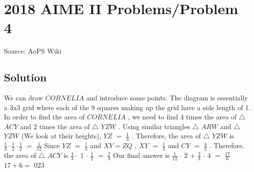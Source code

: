 \documentclass[12pt]{article}
\begin{document}
\section*{{2018 AIME II Problems/Problem 4}}
Source: AoPS Wiki

\subsection*{Solution}
We can draw $CORNELIA$ and introduce some points. The diagram is essentially a 3x3 grid where each of the 9 squares making up the grid have a side length of 1. In order to find the area of $CORNELIA$ , we need to find 4 times the area of $\bigtriangleup$ $ACY$ and 2 times the area of $\bigtriangleup$ $YZW$ . Using similar triangles $\bigtriangleup$ $ARW$ and $\bigtriangleup$ $YZW$ (We look at their heights), $YZ$ $=$ $\frac{1}{3}$ . Therefore, the area of $\bigtriangleup$ $YZW$ is $\frac{1}{3}\cdot\frac{1}{2}\cdot\frac{1}{2}$ $=$ $\frac{1}{12}$ Since $YZ$ $=$ $\frac{1}{3}$ and $XY = ZQ$ , $XY$ $=$ $\frac{1}{3}$ and $CY$ $=$ $\frac{4}{3}$ . Therefore, the area of $\bigtriangleup$ $ACY$ is $\frac{4}{3}\cdot$ $1$ $\cdot$ $\frac{1}{2}$ $=$ $\frac{2}{3}$ Our final answer is $\frac{1}{12}$ $\cdot$ $2$ $+$ $\frac{2}{3}$ $\cdot$ $4$ $=$ $\frac{17}{6}$ $17 + 6 =$ $\boxed{023}$
\end{document}
